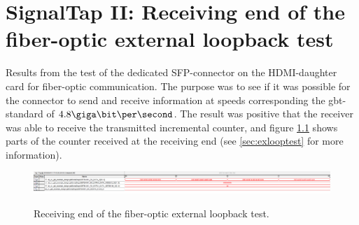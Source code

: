 \documentclass[main.tex]{subfiles}
\begin{document}
\chapter{SignalTap II: Receiving end of the fiber-optic external loopback test}

Results from the test of the dedicated SFP-connector on the HDMI-daughter card for fiber-optic communication. The purpose was to see if it was possible for the connector to send and receive information at speeds corresponding the \gls{gbt}-standard of $4.8 \giga\bit\per\second$. The result was positive that the receiver was able to receive the transmitted incremental counter, and figure \ref{fig:lb_rx} shows parts of the counter received at the receiving end (see \ref{sec:exlooptest} for more information).   

\begin{figure} %
\begin{center}
\includegraphics[width=\linewidth]{../img/gbt_rx_loopback}  \\[0.1 cm]
\caption{Receiving end of the fiber-optic external loopback test.}
\label{fig:lb_rx}
\end{center}
\end{figure}
\end{document}
